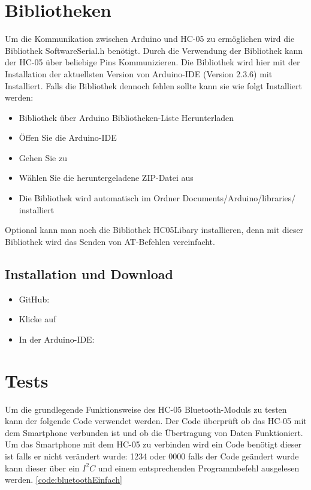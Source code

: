 \section{Bibliotheken}

Um die Kommunikation zwischen Arduino und HC-05 zu ermöglichen wird die Bibliothek SoftwareSerial.h benötigt. Durch die Verwendung der Bibliothek kann der HC-05 über beliebige Pins Kommunizieren. Die Bibliothek wird hier mit der Installation der aktuellsten Version von Arduino-IDE (Version 2.3.6) mit Installiert. Falls die Bibliothek dennoch fehlen sollte kann sie wie folgt Installiert werden:

\begin{itemize}
    \item Bibliothek über Arduino Bibliotheken-Liste Herunterladen
    \item Öffen Sie die Arduino-IDE
    \item Gehen Sie zu 
    \item Wählen Sie die heruntergeladene ZIP-Datei aus
    \item Die Bibliothek wird automatisch im Ordner Documents/Arduino/libraries/ installiert 
\end{itemize}

Optional kann man noch die Bibliothek HC05Libary installieren, denn mit dieser Bibliothek wird das Senden von AT-Befehlen vereinfacht.\\

\subsection{Installation und Download}

\begin{itemize}
    \item GitHub: 
    \item Klicke auf 
    \item In der Arduino-IDE: 
\end{itemize}


\section{Tests}
Um die grundlegende Funktionsweise des HC-05 Bluetooth-Moduls zu testen kann der folgende Code verwendet werden. Der Code überprüft ob das HC-05 mit dem Smartphone verbunden ist und ob die Übertragung von Daten Funktioniert. Um das Smartphone mit dem HC-05 zu verbinden wird ein Code benötigt dieser ist falls er nicht verändert wurde: 1234 oder 0000 falls der Code geändert wurde kann dieser über ein $I^2C $ und einem entsprechenden Programmbefehl ausgelesen werden. \ref{code:bluetoothEinfach}

